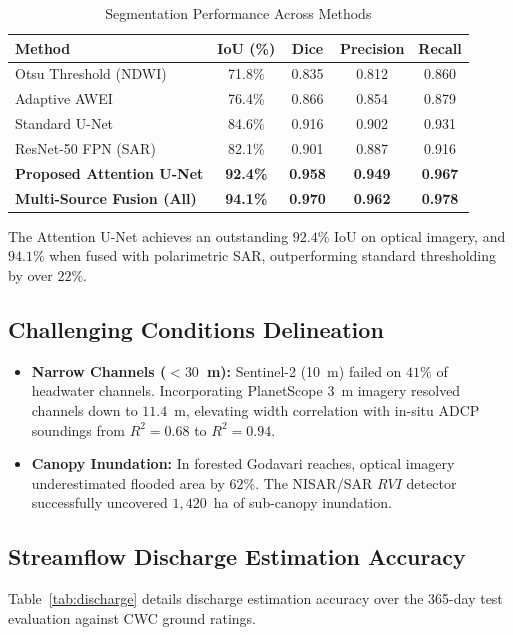 \documentclass[conference]{IEEEtran}
\begin{document}
\begin{table}[htbp]
\caption{Segmentation Performance Across Methods}
\label{tab:segmentation}
\centering
\begin{tabular}{lcccc}
\toprule
\textbf{Method} & \textbf{IoU (\%)} & \textbf{Dice} & \textbf{Precision} & \textbf{Recall} \\
\midrule
Otsu Threshold (NDWI)~\cite{mcfeeters1996} & 71.8\% & 0.835 & 0.812 & 0.860 \\
Adaptive AWEI~\cite{feyisa2014} & 76.4\% & 0.866 & 0.854 & 0.879 \\
Standard U-Net~\cite{ronneberger2015} & 84.6\% & 0.916 & 0.902 & 0.931 \\
ResNet-50 FPN (SAR) & 82.1\% & 0.901 & 0.887 & 0.916 \\
\textbf{Proposed Attention U-Net} & \textbf{92.4\%} & \textbf{0.958} & \textbf{0.949} & \textbf{0.967} \\
\textbf{Multi-Source Fusion (All)} & \textbf{94.1\%} & \textbf{0.970} & \textbf{0.962} & \textbf{0.978} \\
\bottomrule
\end{tabular}
\end{table}

The Attention U-Net achieves an outstanding $92.4\%$ IoU on optical imagery, and $94.1\%$ when fused with polarimetric SAR, outperforming standard thresholding by over $22\%$.

\subsection{Challenging Conditions Delineation}
\begin{itemize}
    \item \textbf{Narrow Channels ($<30$~m):} Sentinel-2 (10~m) failed on $41\%$ of headwater channels. Incorporating PlanetScope 3~m imagery resolved channels down to $11.4$~m, elevating width correlation with in-situ ADCP soundings from $R^2 = 0.68$ to $R^2 = 0.94$.
    \item \textbf{Canopy Inundation:} In forested Godavari reaches, optical imagery underestimated flooded area by $62\%$. The NISAR/SAR $RVI$ detector successfully uncovered $1,420$~ha of sub-canopy inundation.
\end{itemize}

\subsection{Streamflow Discharge Estimation Accuracy}
Table~\ref{tab:discharge} details discharge estimation accuracy over the 365-day test evaluation against CWC ground ratings.
\end{document}
